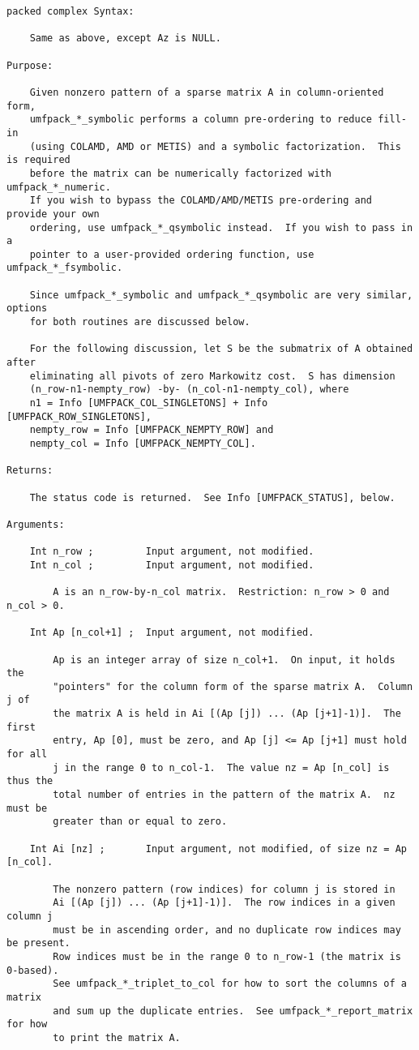 \documentclass[11pt]{article}
\begin{document}
{\begin{verbatim}
packed complex Syntax:

    Same as above, except Az is NULL.

Purpose:

    Given nonzero pattern of a sparse matrix A in column-oriented form,
    umfpack_*_symbolic performs a column pre-ordering to reduce fill-in
    (using COLAMD, AMD or METIS) and a symbolic factorization.  This is required
    before the matrix can be numerically factorized with umfpack_*_numeric.
    If you wish to bypass the COLAMD/AMD/METIS pre-ordering and provide your own
    ordering, use umfpack_*_qsymbolic instead.  If you wish to pass in a
    pointer to a user-provided ordering function, use umfpack_*_fsymbolic.

    Since umfpack_*_symbolic and umfpack_*_qsymbolic are very similar, options
    for both routines are discussed below.

    For the following discussion, let S be the submatrix of A obtained after
    eliminating all pivots of zero Markowitz cost.  S has dimension
    (n_row-n1-nempty_row) -by- (n_col-n1-nempty_col), where
    n1 = Info [UMFPACK_COL_SINGLETONS] + Info [UMFPACK_ROW_SINGLETONS],
    nempty_row = Info [UMFPACK_NEMPTY_ROW] and
    nempty_col = Info [UMFPACK_NEMPTY_COL].

Returns:

    The status code is returned.  See Info [UMFPACK_STATUS], below.

Arguments:

    Int n_row ;         Input argument, not modified.
    Int n_col ;         Input argument, not modified.

        A is an n_row-by-n_col matrix.  Restriction: n_row > 0 and n_col > 0.

    Int Ap [n_col+1] ;  Input argument, not modified.

        Ap is an integer array of size n_col+1.  On input, it holds the
        "pointers" for the column form of the sparse matrix A.  Column j of
        the matrix A is held in Ai [(Ap [j]) ... (Ap [j+1]-1)].  The first
        entry, Ap [0], must be zero, and Ap [j] <= Ap [j+1] must hold for all
        j in the range 0 to n_col-1.  The value nz = Ap [n_col] is thus the
        total number of entries in the pattern of the matrix A.  nz must be
        greater than or equal to zero.

    Int Ai [nz] ;       Input argument, not modified, of size nz = Ap [n_col].

        The nonzero pattern (row indices) for column j is stored in
        Ai [(Ap [j]) ... (Ap [j+1]-1)].  The row indices in a given column j
        must be in ascending order, and no duplicate row indices may be present.
        Row indices must be in the range 0 to n_row-1 (the matrix is 0-based).
        See umfpack_*_triplet_to_col for how to sort the columns of a matrix
        and sum up the duplicate entries.  See umfpack_*_report_matrix for how
        to print the matrix A.


\end{verbatim}}
\end{document}

